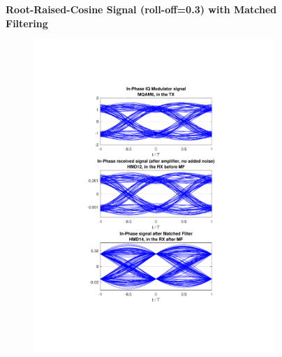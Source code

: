 \begin{refsection}
\begin{table}[H]
\begin{tabular}{|l|l|}
	\end{tabular}
\end{table}
\begin{figure}[H]
		\centering
	\textbf{Root-Raised-Cosine Signal (roll-off=0.3) with Matched Filtering}
	\begin{minipage}{\linewidth}
		\centering
	\begin{subfigure}{.45\textwidth}
		\centering
		\includegraphics[clip, trim=4cm 4cm 4cm 4cm,
			width=\textwidth]{./sdf/m_qam_system/figures/eyes/simulRrc03Sp60Np00_i.pdf}
	\end{subfigure}
	\begin{subfigure}{.45\textwidth}
		\centering

\end{subfigure}
\end{minipage}
\end{figure}
\end{refsection}
